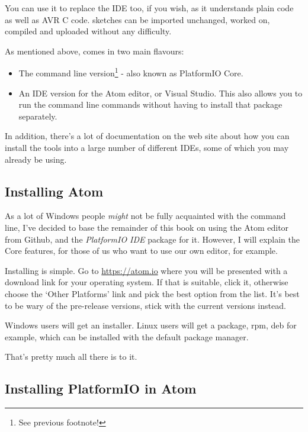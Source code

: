You can use it to replace the   IDE too, if you wish, as it understands plain   code as well as AVR C code.   sketches can be imported unchanged, worked on, compiled and uploaded without any difficulty.

As mentioned above,  comes in two main flavours:

\begin{itemize}
\item
  The command line version\footnote{See previous footnote!} - also known as PlatformIO Core.
\item
  An IDE version for the Atom editor, or Visual Studio. This also allows   you to run the command line commands without having to install that   package separately.
\end{itemize}

In addition, there's a lot of documentation on the web site about how you can install the  tools into a large number of different IDEs, some of which you may already be using.

\subsection{Installing Atom}\label{installing-atom}

As a lot of Windows people \emph{might} not be fully acquainted with the command line, I've decided to base the remainder of this book on using the Atom editor from Github, and the \emph{PlatformIO IDE} package for it. However, I will explain the Core features, for those of us who want to use our own editor, for example.

Installing is simple. Go to \href{https://atom.io}{https://atom.io} where you will be presented with a download link for your operating system. If that is suitable, click it, otherwise choose the `Other Platforms' link and pick the best option from the list. It's best to be wary of the pre-release versions, stick with the current versions instead.

Windows users will get an installer. Linux users will get a package, rpm, deb for example, which can be installed with the default package manager.

That's pretty much all there is to it.

\subsection{Installing PlatformIO in Atom}\label{installing-platformio-in-atom}

